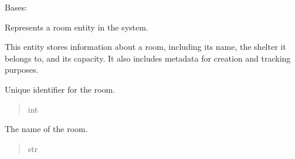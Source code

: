 \documentclass[letterpaper,10pt,english]{sphinxmanual}
\begin{document}
\begin{fulllineitems}
\label{\detokenize{app.mysql:app.mysql.room.Room}}
\pysigstartsignatures
\pysiglinewithargsret
{}
{}
{}
\pysigstopsignatures
\sphinxAtStartPar
Bases: 

\sphinxAtStartPar
Represents a room entity in the system.

\sphinxAtStartPar
This entity stores information about a room, including its name,
the shelter it belongs to, and its capacity. It also includes
metadata for creation and tracking purposes.

\begin{fulllineitems}
\label{\detokenize{app.mysql:app.mysql.room.Room.idRoom}}
\pysigstartsignatures
\pysigline
{}
\pysigstopsignatures
\sphinxAtStartPar
Unique identifier for the room.
\begin{quote}\begin{description}
\sphinxAtStartPar
int

\end{description}\end{quote}

\end{fulllineitems}


\begin{fulllineitems}
\label{\detokenize{app.mysql:app.mysql.room.Room.roomName}}
\pysigstartsignatures
\pysigline
{}
\pysigstopsignatures
\sphinxAtStartPar
The name of the room.
\begin{quote}\begin{description}
\sphinxAtStartPar
str

\end{description}\end{quote}

\end{fulllineitems}



\end{fulllineitems}
\end{document}
